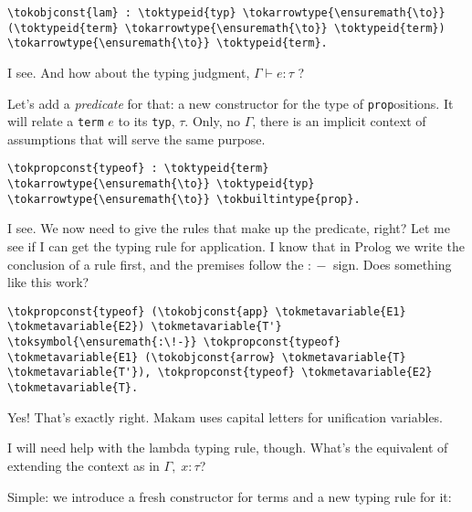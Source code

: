 \begin{verbatim}
\tokobjconst{lam} : \toktypeid{typ} \tokarrowtype{\ensuremath{\to}} (\toktypeid{term} \tokarrowtype{\ensuremath{\to}} \toktypeid{term}) \tokarrowtype{\ensuremath{\to}} \toktypeid{term}.
\end{verbatim}

\importantCodeblockEnd{}

\heroSTUDENT{} I see. And how about the typing judgment,
\(\Gamma \vdash e : \tau\) ?

\heroADVISOR{} Let's add a \emph{predicate} for that: a new constructor for
the type of \texttt{prop}ositions. It will relate a \texttt{term} \(e\)
to its \texttt{typ}, \(\tau\). Only, no \(\Gamma\), there is an implicit
context of assumptions that will serve the same purpose.

\importantCodeblock{}

\begin{verbatim}
\tokpropconst{typeof} : \toktypeid{term} \tokarrowtype{\ensuremath{\to}} \toktypeid{typ} \tokarrowtype{\ensuremath{\to}} \tokbuiltintype{prop}.
\end{verbatim}

\importantCodeblockEnd{}

\heroSTUDENT{} I see. We now need to give the rules that make up the
predicate, right? Let me see if I can get the typing rule for
application. I know that in Prolog we write the conclusion of a rule
first, and the premises follow the \texttt{\ensuremath{:\!-}} sign. Does something like
this work?

\importantCodeblock{}

\begin{verbatim}
\tokpropconst{typeof} (\tokobjconst{app} \tokmetavariable{E1} \tokmetavariable{E2}) \tokmetavariable{T'} \toksymbol{\ensuremath{:\!-}} \tokpropconst{typeof} \tokmetavariable{E1} (\tokobjconst{arrow} \tokmetavariable{T} \tokmetavariable{T'}), \tokpropconst{typeof} \tokmetavariable{E2} \tokmetavariable{T}.
\end{verbatim}

\importantCodeblockEnd{}

\heroADVISOR{} Yes! That's exactly right. Makam uses capital letters for
unification variables.

\heroSTUDENT{} I will need help with the lambda typing rule, though. What's
the equivalent of extending the context as in \(\Gamma, \; x : \tau\)?

\heroADVISOR{} Simple: we introduce a fresh constructor for terms and a new
typing rule for it:


